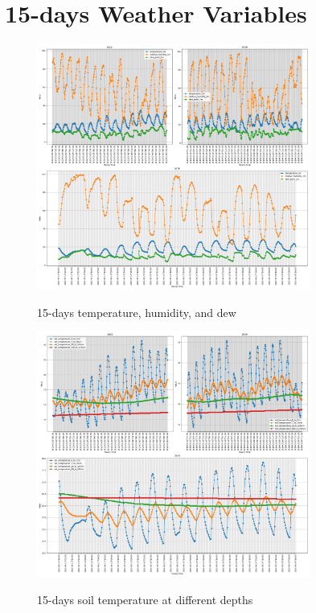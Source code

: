 \section{15-days Weather Variables}

\begin{figure}[h]
	\centering
	\caption{15-days temperature, humidity, and dew}
	\includegraphics[width=0.8\textwidth]{graphs/weather_variables/15_temperature_2m_relative_humidity_2m_dew_point_2m.png}
	\label{fig:temp_hum_dew}
\end{figure}

\begin{figure}[h]
	\centering
	\caption{15-days soil temperature at different depths }
	\includegraphics[width=0.8\textwidth]{graphs/weather_variables/15_soil_temperature_0_to_7cm_soil_temperature_7_to_28cm_soil_temperature_28_to_100cm.png}
	\label{fig:soil_temp}
\end{figure}

